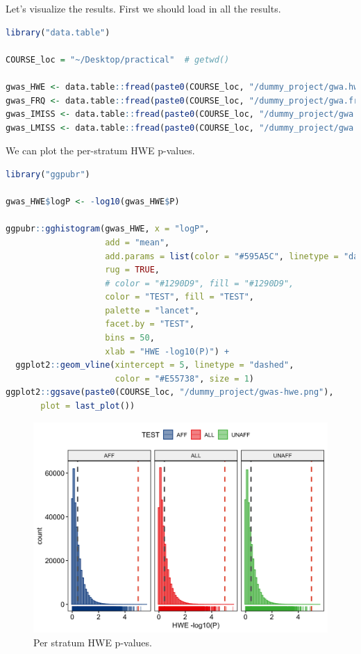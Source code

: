 \documentclass[
]{book}
\begin{document}
Let's visualize the results. First we should load in all the results.

\begin{lstlisting}[language=R]
library("data.table")

COURSE_loc = "~/Desktop/practical"  # getwd()

gwas_HWE <- data.table::fread(paste0(COURSE_loc, "/dummy_project/gwa.hwe"))
gwas_FRQ <- data.table::fread(paste0(COURSE_loc, "/dummy_project/gwa.frq"))
gwas_IMISS <- data.table::fread(paste0(COURSE_loc, "/dummy_project/gwa.imiss"))
gwas_LMISS <- data.table::fread(paste0(COURSE_loc, "/dummy_project/gwa.lmiss"))
\end{lstlisting}

We can plot the per-stratum HWE p-values.

\begin{lstlisting}[language=R]
library("ggpubr")

gwas_HWE$logP <- -log10(gwas_HWE$P)

ggpubr::gghistogram(gwas_HWE, x = "logP",
                    add = "mean",
                    add.params = list(color = "#595A5C", linetype = "dashed", size = 1),
                    rug = TRUE,
                    # color = "#1290D9", fill = "#1290D9",
                    color = "TEST", fill = "TEST",
                    palette = "lancet",
                    facet.by = "TEST",
                    bins = 50,
                    xlab = "HWE -log10(P)") +
  ggplot2::geom_vline(xintercept = 5, linetype = "dashed",
                      color = "#E55738", size = 1)
ggplot2::ggsave(paste0(COURSE_loc, "/dummy_project/gwas-hwe.png"),
       plot = last_plot())
\end{lstlisting}

\begin{figure}[H]

{\centering \includegraphics[width=18.67in]{img/_gwas_dummy/show-hwe-gwas} 

}

\caption{Per stratum HWE p-values.}\label{fig:show-hwe-gwas}
\end{figure}
\end{document}
